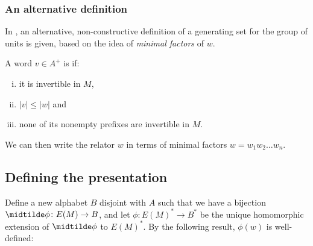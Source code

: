 \documentclass[showlabels,noindex,12pt]{lmaths}
\begin{document}
\subsubsection{An alternative definition}

In \cite{Zhang1992}, an alternative, non-constructive definition of a generating set for the group of units is given, based on the idea of \emph{minimal factors} of $w$.

\begin{defn}
	A word $v \in A^+$ is  if:
	\begin{enumerate}[(i)]
		\item it is invertible in $M$,
		\item $|v| \le |w|$ and
		\item none of its nonempty prefixes are invertible in $M$.
	\end{enumerate}
\end{defn}

We can then write the relator $w$ in terms of minimal factors $w = w_1w_2\ldots w_n$.


\subsection{Defining the presentation}

Define a new alphabet $B$ disjoint with $A$ such that we have a bijection $\midtilde\phi \colon E(M) \to B$, and let $\phi \colon E(M)^* \to B^*$ be the unique homomorphic extension of $\midtilde\phi$ to $E(M)^*$. By the following result, $\phi(w)$ is well-defined:
\end{document}
